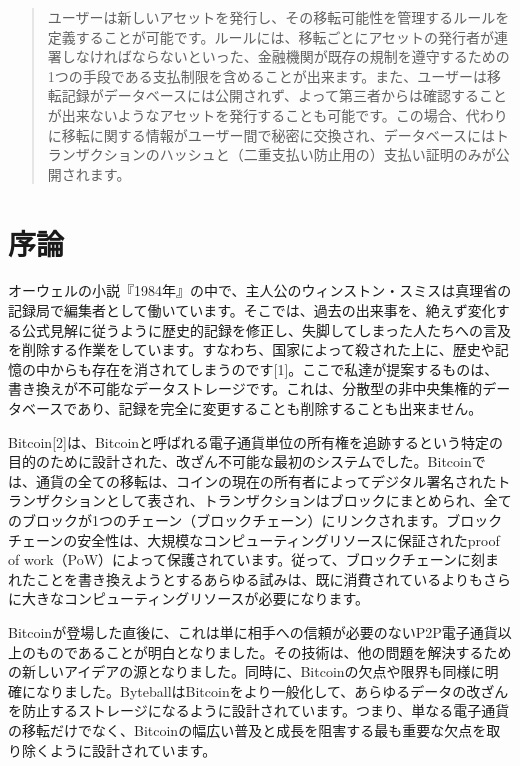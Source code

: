 \documentclass[a4paper, dvipdfmx]{jsarticle}
\begin{document}
\begin{abstract}
ユーザーは新しいアセットを発行し、その移転可能性を管理するルールを定義することが可能です。ルールには、移転ごとにアセットの発行者が連署しなければならないといった、金融機関が既存の規制を遵守するための1つの手段である支払制限を含めることが出来ます。また、ユーザーは移転記録がデータベースには公開されず、よって第三者からは確認することが出来ないようなアセットを発行することも可能です。この場合、代わりに移転に関する情報がユーザー間で秘密に交換され、データベースにはトランザクションのハッシュと（二重支払い防止用の）支払い証明のみが公開されます。
\end{abstract}

\newpage
\section{序論}
オーウェルの小説『1984年』の中で、主人公のウィンストン・スミスは真理省の記録局で編集者として働いています。そこでは、過去の出来事を、絶えず変化する公式見解に従うように歴史的記録を修正し、失脚してしまった人たちへの言及を削除する作業をしています。すなわち、国家によって殺された上に、歴史や記憶の中からも存在を消されてしまうのです[1]。ここで私達が提案するものは、書き換えが不可能なデータストレージです。これは、分散型の非中央集権的データベースであり、記録を完全に変更することも削除することも出来ません。

Bitcoin[2]は、Bitcoinと呼ばれる電子通貨単位の所有権を追跡するという特定の目的のために設計された、改ざん不可能な最初のシステムでした。Bitcoinでは、通貨の全ての移転は、コインの現在の所有者によってデジタル署名されたトランザクションとして表され、トランザクションはブロックにまとめられ、全てのブロックが1つのチェーン（ブロックチェーン）にリンクされます。ブロックチェーンの安全性は、大規模なコンピューティングリソースに保証されたproof of work（PoW）によって保護されています。従って、ブロックチェーンに刻まれたことを書き換えようとするあらゆる試みは、既に消費されているよりもさらに大きなコンピューティングリソースが必要になります。

Bitcoinが登場した直後に、これは単に相手への信頼が必要のないP2P電子通貨以上のものであることが明白となりました。その技術は、他の問題を解決するための新しいアイデアの源となりました。同時に、Bitcoinの欠点や限界も同様に明確になりました。ByteballはBitcoinをより一般化して、あらゆるデータの改ざんを防止するストレージになるように設計されています。つまり、単なる電子通貨の移転だけでなく、Bitcoinの幅広い普及と成長を阻害する最も重要な欠点を取り除くように設計されています。
\end{document}
